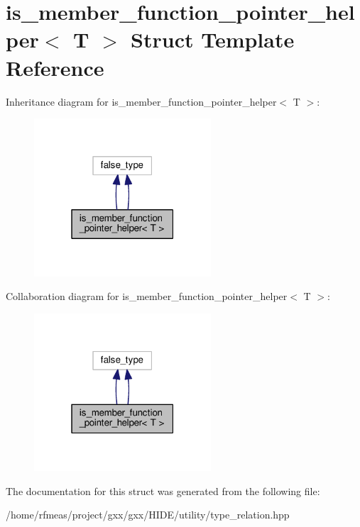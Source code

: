 \hypertarget{structis__member__function__pointer__helper}{}\section{is\+\_\+member\+\_\+function\+\_\+pointer\+\_\+helper$<$ T $>$ Struct Template Reference}
\label{structis__member__function__pointer__helper}


Inheritance diagram for is\+\_\+member\+\_\+function\+\_\+pointer\+\_\+helper$<$ T $>$\+:
\nopagebreak
\begin{figure}[H]
\begin{center}
\leavevmode
\includegraphics[width=187pt]{structis__member__function__pointer__helper__inherit__graph}
\end{center}
\end{figure}


Collaboration diagram for is\+\_\+member\+\_\+function\+\_\+pointer\+\_\+helper$<$ T $>$\+:
\nopagebreak
\begin{figure}[H]
\begin{center}
\leavevmode
\includegraphics[width=187pt]{structis__member__function__pointer__helper__coll__graph}
\end{center}
\end{figure}


The documentation for this struct was generated from the following file\+:\begin{DoxyCompactItemize}
\item 
/home/rfmeas/project/gxx/gxx/\+H\+I\+D\+E/utility/type\+\_\+relation.\+hpp\end{DoxyCompactItemize}
